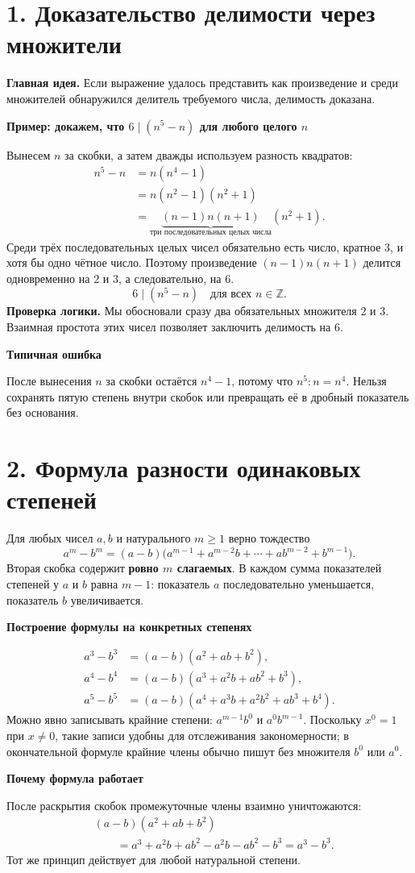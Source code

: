 \documentclass[a4paper,12pt]{article}
\newcommand{\important}[1]{\textcolor{deepaccent}{\textbf{#1}}}
\newcommand{\method}[1]{\medskip\noindent\textcolor{deepaccent}{\textbf{#1}}\quad}
\newcommand{\sectiontitle}[1]{\needspace{5\baselineskip}\section*{\color{deepaccent}#1}}
\newcommand{\subtopic}[1]{\medskip\textbf{\color{accent}#1}\par\vspace{-2pt}}
\begin{document}
\sectiontitle{1. Доказательство делимости через множители}
\important{Главная идея.} Если выражение удалось представить как произведение и среди множителей обнаружился делитель требуемого числа, делимость доказана.

\subtopic{Пример: докажем, что $6\mid(n^5-n)$ для любого целого $n$}
Вынесем $n$ за скобки, а затем дважды используем разность квадратов:
\begin{align*}
n^5-n &= n(n^4-1)\\
      &= n(n^2-1)(n^2+1)\\
      &= \underbrace{(n-1)n(n+1)}_{\text{три последовательных целых числа}}(n^2+1).
\end{align*}
Среди трёх последовательных целых чисел обязательно есть число, кратное $3$, и хотя бы одно чётное число. Поэтому произведение $(n-1)n(n+1)$ делится одновременно на $2$ и $3$, а следовательно, на $6$.
\[
\boxed{6\mid(n^5-n)\quad\text{для всех }n\in\mathbb Z.}
\]
\method{Проверка логики.} Мы обосновали сразу два обязательных множителя $2$ и $3$. Взаимная простота этих чисел позволяет заключить делимость на $6$.

\subtopic{Типичная ошибка}
После вынесения $n$ за скобки остаётся $n^4-1$, потому что $n^5:n=n^4$. Нельзя сохранять пятую степень внутри скобок или превращать её в дробный показатель без основания.

\sectiontitle{2. Формула разности одинаковых степеней}
Для любых чисел $a,b$ и натурального $m\ge1$ верно тождество
\[
\boxed{a^m-b^m=(a-b)\bigl(a^{m-1}+a^{m-2}b+\cdots+ab^{m-2}+b^{m-1}\bigr).}
\]
Вторая скобка содержит \important{ровно $m$ слагаемых}. В каждом сумма показателей степеней у $a$ и $b$ равна $m-1$: показатель $a$ последовательно уменьшается, показатель $b$ увеличивается.

\subtopic{Построение формулы на конкретных степенях}
\begin{align*}
a^3-b^3 &= (a-b)(a^2+ab+b^2),\\
a^4-b^4 &= (a-b)(a^3+a^2b+ab^2+b^3),\\
a^5-b^5 &= (a-b)(a^4+a^3b+a^2b^2+ab^3+b^4).
\end{align*}
Можно явно записывать крайние степени: $a^{m-1}b^0$ и $a^0b^{m-1}$. Поскольку $x^0=1$ при $x\ne0$, такие записи удобны для отслеживания закономерности; в окончательной формуле крайние члены обычно пишут без множителя $b^0$ или $a^0$.

\subtopic{Почему формула работает}
После раскрытия скобок промежуточные члены взаимно уничтожаются:
\begin{align*}
&(a-b)(a^2+ab+b^2)\\
&\qquad =a^3+a^2b+ab^2-a^2b-ab^2-b^3=a^3-b^3.
\end{align*}
Тот же принцип действует для любой натуральной степени.
\end{document}
